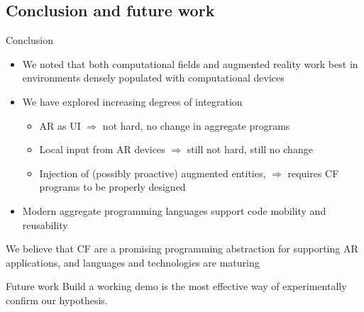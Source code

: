 \documentclass[presentation]{beamer} %
\begin{document}
\subsection{Conclusion and future work}
\begin{frame}{Conclusion}
  \begin{itemize}
    \item We noted that both computational fields and augmented reality work best in environments densely populated with computational devices
    \item We have explored increasing degrees of integration
    \begin{itemize}
      \item AR as UI $\Rightarrow$ not hard, no change in aggregate programs
      \item Local input from AR devices $\Rightarrow$ still not hard, still no change
      \item Injection of (possibly proactive) augmented entities, $\Rightarrow$ requires CF programs to be properly designed
    \end{itemize}
    \item Modern aggregate programming languages support code mobility and reusability
  \end{itemize}
  \begin{block}{}
    We believe that CF are a promising programming abstraction for supporting AR applications, and languages and technologies are maturing
  \end{block}
  \begin{block}{Future work}
    Build a working demo is the most effective way of experimentally confirm our hypothesis.
  \end{block}
\end{frame}




\section*{\refname}
\begin{frame}[allowframebreaks]
  \frametitle{\refname}
  \scriptsize
  
  
\end{frame}
\section*{\refname}
\end{document}
